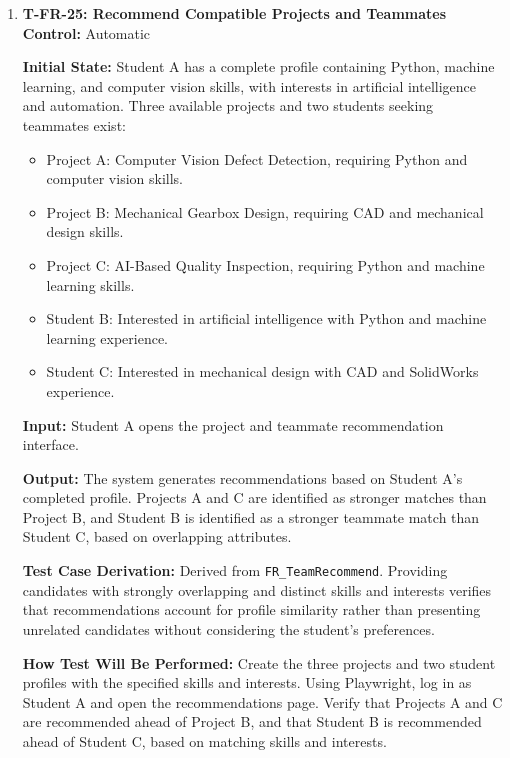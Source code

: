 \documentclass[12pt, titlepage]{article}
\begin{document}
\begin{enumerate}

\item \label{T-FR-25}\textbf{T-FR-25: Recommend Compatible Projects and Teammates}\\

\textbf{Control:} Automatic

\textbf{Initial State:} Student A has a complete profile containing Python, machine learning, and computer vision skills, with interests in artificial intelligence and automation. Three available projects and two students seeking teammates exist:
\begin{itemize}
    \item Project A: Computer Vision Defect Detection, requiring Python and computer vision skills.
    \item Project B: Mechanical Gearbox Design, requiring CAD and mechanical design skills.
    \item Project C: AI-Based Quality Inspection, requiring Python and machine learning skills.
    \item Student B: Interested in artificial intelligence with Python and machine learning experience.
    \item Student C: Interested in mechanical design with CAD and SolidWorks experience.
\end{itemize}

\textbf{Input:} Student A opens the project and teammate recommendation interface.

\textbf{Output:} The system generates recommendations based on Student A's completed profile. Projects A and C are identified as stronger matches than Project B, and Student B is identified as a stronger teammate match than Student C, based on overlapping attributes.

\textbf{Test Case Derivation:} Derived from \texttt{FR\_TeamRecommend}. Providing candidates with strongly overlapping and distinct skills and interests verifies that recommendations account for profile similarity rather than presenting unrelated candidates without considering the student's preferences.

\textbf{How Test Will Be Performed:} Create the three projects and two student profiles with the specified skills and interests. Using Playwright, log in as Student A and open the recommendations page. Verify that Projects A and C are recommended ahead of Project B, and that Student B is recommended ahead of Student C, based on matching skills and interests.


\end{enumerate}
\end{document}
